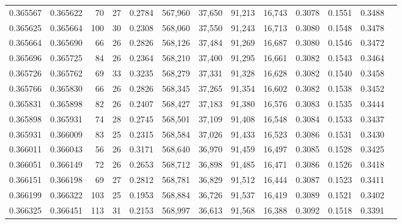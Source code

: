 \begin{tabular}{rrrrrrrrrrrrr}
0.365567 & 0.365622 &    70 &  27 &                                     0.2784 & 567,960 &  37,650 &  91,213 &  16,743 & 0.3078 & 0.1551 & 0.3488 \\
0.365625 & 0.365664 &   100 &  30 &                                     0.2308 & 568,060 &  37,550 &  91,243 &  16,713 & 0.3080 & 0.1548 & 0.3478 \\
0.365664 & 0.365690 &    66 &  26 &                                     0.2826 & 568,126 &  37,484 &  91,269 &  16,687 & 0.3080 & 0.1546 & 0.3472 \\
0.365696 & 0.365725 &    84 &  26 &                                     0.2364 & 568,210 &  37,400 &  91,295 &  16,661 & 0.3082 & 0.1543 & 0.3464 \\
0.365726 & 0.365762 &    69 &  33 &                                     0.3235 & 568,279 &  37,331 &  91,328 &  16,628 & 0.3082 & 0.1540 & 0.3458 \\
0.365766 & 0.365830 &    66 &  26 &                                     0.2826 & 568,345 &  37,265 &  91,354 &  16,602 & 0.3082 & 0.1538 & 0.3452 \\
0.365831 & 0.365898 &    82 &  26 &                                     0.2407 & 568,427 &  37,183 &  91,380 &  16,576 & 0.3083 & 0.1535 & 0.3444 \\
0.365898 & 0.365931 &    74 &  28 &                                     0.2745 & 568,501 &  37,109 &  91,408 &  16,548 & 0.3084 & 0.1533 & 0.3437 \\
0.365931 & 0.366009 &    83 &  25 &                                     0.2315 & 568,584 &  37,026 &  91,433 &  16,523 & 0.3086 & 0.1531 & 0.3430 \\
0.366011 & 0.366043 &    56 &  26 &                                     0.3171 & 568,640 &  36,970 &  91,459 &  16,497 & 0.3085 & 0.1528 & 0.3425 \\
0.366051 & 0.366149 &    72 &  26 &                                     0.2653 & 568,712 &  36,898 &  91,485 &  16,471 & 0.3086 & 0.1526 & 0.3418 \\
0.366151 & 0.366198 &    69 &  27 &                                     0.2812 & 568,781 &  36,829 &  91,512 &  16,444 & 0.3087 & 0.1523 & 0.3411 \\
0.366199 & 0.366322 &   103 &  25 &                                     0.1953 & 568,884 &  36,726 &  91,537 &  16,419 & 0.3089 & 0.1521 & 0.3402 \\
0.366325 & 0.366451 &   113 &  31 &                                     0.2153 & 568,997 &  36,613 &  91,568 &  16,388 & 0.3092 & 0.1518 & 0.3391 \\

\end{tabular}
